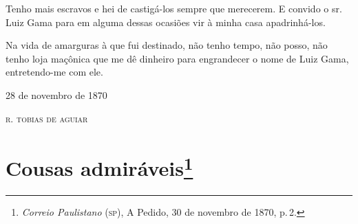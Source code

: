 Tenho mais escravos e hei de castigá-los sempre que merecerem. E convido
o sr.\,Luiz Gama para em alguma dessas ocasiões vir à minha casa
apadrinhá-los.

Na vida de amarguras à que fui destinado, não tenho tempo, não posso,
não tenho loja maçônica que me dê dinheiro para engrandecer o nome de
Luiz Gama, entretendo-me com ele.

\begin{flushright}
28 de novembro de 1870

\textsc{r. tobias de aguiar}
\end{flushright}

\chapter{Cousas admiráveis\footnote{\emph{Correio Paulistano} (\textsc{sp}), A Pedido, 30 de novembro de 1870,
  p.\,2.}} %

